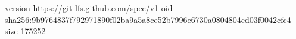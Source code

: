 version https://git-lfs.github.com/spec/v1
oid sha256:9b9764837f792971890f02ba9a5a8ce52b7996e6730a0804804cd03f0042cfc4
size 175252
